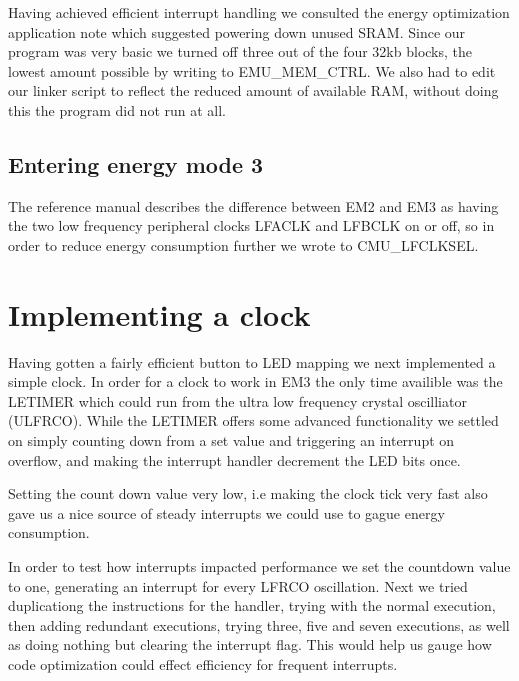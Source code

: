 Having achieved efficient interrupt handling we consulted the energy optimization application note which suggested powering down unused SRAM. Since our program was very basic we turned off three out of the four 32kb blocks, the lowest amount possible by writing to EMU\_MEM\_CTRL. We also had to edit our linker script to reflect the reduced amount of available RAM, without doing this the program did not run at all.

\subsection{Entering energy mode 3}

The reference manual describes the difference between EM2 and EM3 as having the two low frequency peripheral clocks LFACLK and LFBCLK on or off, so in order to reduce energy consumption further we wrote to CMU\_LFCLKSEL.

\section{Implementing a clock}

Having gotten a fairly efficient button to LED mapping we next implemented a simple clock. In order for a clock to work in EM3 the only time availible was the LETIMER which could run from the ultra low frequency crystal oscilliator (ULFRCO). While the LETIMER offers some advanced functionality we settled on simply counting down from a set value and triggering an interrupt on overflow, and making the interrupt handler decrement the LED bits once.

Setting the count down value very low, i.e making the clock tick very fast also gave us a nice source of steady interrupts we could use to gague energy consumption.

In order to test how interrupts impacted performance we set the countdown value to one, generating an interrupt for every LFRCO oscillation. Next we tried duplicationg the instructions for the handler, trying with the normal execution, then adding redundant executions, trying three, five and seven executions, as well as doing nothing but clearing the interrupt flag. This would help us gauge how code optimization could effect efficiency for frequent interrupts. 